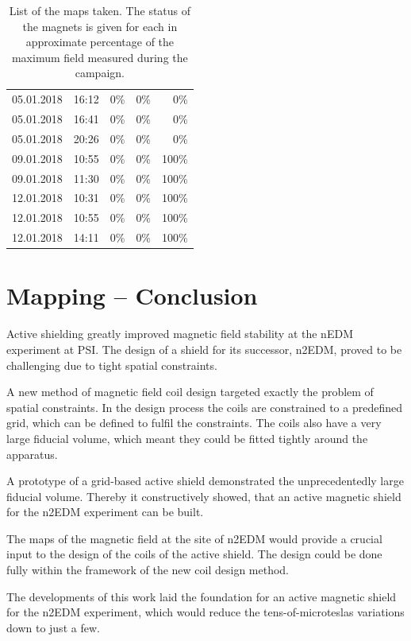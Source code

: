 \begin{table}
\begin{tabular}{ccrrr}
    05.01.2018  &  16:12  &  0\%      &  0\%    &  0\%    \\
    05.01.2018  &  16:41  &  0\%      &  0\%    &  0\%    \\
    05.01.2018  &  20:26  &  0\%      &  0\%    &  0\%    \\
    09.01.2018  &  10:55  &  0\%      &  0\%    &  100\%  \\
    09.01.2018  &  11:30  &  0\%      &  0\%    &  100\%  \\
    12.01.2018  &  10:31  &  0\%      &  0\%    &  100\%  \\
    12.01.2018  &  10:55  &  0\%      &  0\%    &  100\%  \\
    12.01.2018  &  14:11  &  0\%      &  0\%    &  100\%  \\
  \end{tabular}
  \caption{List of the maps taken. The status of the magnets is given for each in approximate percentage of the maximum field measured during the campaign.}\label{tab:psi_mapping_maps}
\end{table}




\section*{Mapping -- Conclusion}
Active shielding greatly improved magnetic field stability at the nEDM experiment at PSI\@. The design of a shield for its successor, n2EDM, proved to be challenging due to tight spatial constraints.

A new method of magnetic field coil design targeted exactly the problem of spatial constraints. In the design process the coils are constrained to a predefined grid, which can be defined to fulfil the constraints. The coils also have a very large fiducial volume, which meant they could be fitted tightly around the apparatus.

A prototype of a grid-based active shield demonstrated the unprecedentedly large fiducial volume. Thereby it constructively showed, that an active magnetic shield for the n2EDM experiment can be built.

The maps of the magnetic field at the site of n2EDM would provide a crucial input to the design of the coils of the active shield. The design could be done fully within the framework of the new coil design method.

The developments of this work laid the foundation for an active magnetic shield for the n2EDM experiment, which would reduce the tens-of-microteslas variations down to just a few.